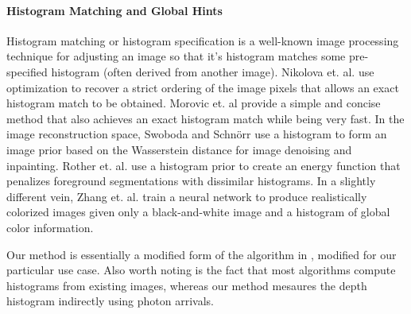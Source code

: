 %

\paragraph{Histogram Matching and Global Hints}
Histogram matching or histogram specification is a well-known image processing
technique \cite{Gonzalez2008} for adjusting an image so that it's histogram
matches some pre-specified histogram (often derived from another image).
Nikolova et. al. \cite{Nikolova2013} use optimization to recover a strict
ordering of the image pixels that allows an exact histogram match to be
obtained. Morovic et. al \cite{Morovic2002} provide a simple and concise method
that also achieves an exact histogram match while being very fast.
In the image reconstruction space, Swoboda and Schnörr \cite{Swoboda2013} use a
histogram to form an image prior based on the Wasserstein distance for image
denoising and inpainting. Rother et. al. \cite{Rother2006} use a histogram prior
to create an energy function that penalizes foreground segmentations with
dissimilar histograms. In a slightly different vein, Zhang et. al.
\cite{Zhang2017} train a neural network to produce realistically colorized
images given only a black-and-white image and a histogram of global color information.

Our method is essentially a modified form of the algorithm in
\cite{Morovic2002}, modified for our particular use case. Also worth noting is
the fact that most algorithms compute histograms from existing images, whereas
our method mesaures the depth histogram indirectly using photon arrivals.
%


